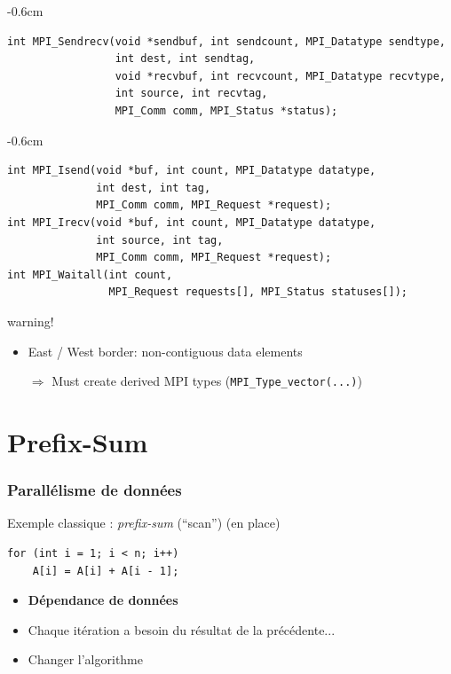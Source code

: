 \documentclass[xcolor={rgb,x11names,svgnames},rgb,x11names,svgnames]{beamer}
\newenvironment{wider}{%
\begin{adjustwidth}{-0.6cm}{}%
  \begin{minipage}{12cm}%
}{%
\end{minipage}%
\end{adjustwidth}%
}
\begin{document}

\begin{frame}[fragile=singleslide]

\begin{wider}
\begin{verbatim}
int MPI_Sendrecv(void *sendbuf, int sendcount, MPI_Datatype sendtype, 
                 int dest, int sendtag, 
                 void *recvbuf, int recvcount, MPI_Datatype recvtype, 
                 int source, int recvtag, 
                 MPI_Comm comm, MPI_Status *status);
\end{verbatim}
\end{wider}

\begin{wider}
\begin{verbatim}
int MPI_Isend(void *buf, int count, MPI_Datatype datatype, 
              int dest, int tag, 
              MPI_Comm comm, MPI_Request *request);
int MPI_Irecv(void *buf, int count, MPI_Datatype datatype,
              int source, int tag, 
              MPI_Comm comm, MPI_Request *request);
int MPI_Waitall(int count, 
                MPI_Request requests[], MPI_Status statuses[]);
\end{verbatim}
\end{wider}

\begin{alertblock}{warning!}
  \begin{itemize}    
  \item East / West border: \alert{non-contiguous} data elements
    \item[$\Rightarrow$] Must create \alert{derived MPI types} (\texttt{MPI_Type_vector(...)})
  \end{itemize}
\end{alertblock}
\end{frame}



\section{Prefix-Sum}

\begin{frame}[fragile]
\frametitle{Parallélisme de données}


\begin{block}{Exemple classique : \emph{prefix-sum} (``scan'') (en place)}
\begin{verbatim}
for (int i = 1; i < n; i++)
    A[i] = A[i] + A[i - 1];
\end{verbatim}
\end{block}

\bigskip

\begin{itemize}
\item \textbf{Dépendance de données}
\item Chaque itération a besoin du résultat de la précédente...
\item Changer l'algorithme   
\end{itemize}
\end{frame}
\end{document}
